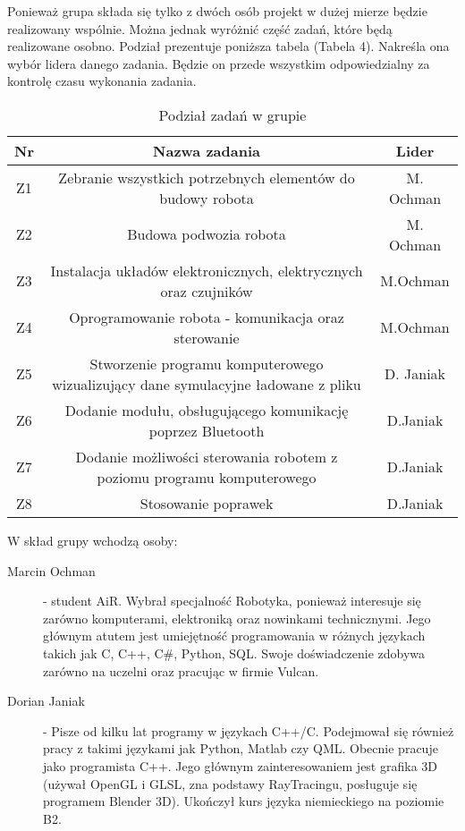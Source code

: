 Ponieważ grupa składa się tylko z dwóch osób projekt w dużej mierze będzie realizowany wspólnie. Można  jednak wyróżnić część zadań, które będą realizowane osobno. Podział prezentuje poniższa tabela (Tabela 4). Nakreśla ona wybór lidera danego zadania. Będzie on przede wszystkim odpowiedzialny za kontrolę czasu wykonania zadania.



\begin{table}[!htbp]
\begin{center}
\begin{tabular}{|c|c|c|}

\hline
\textbf{Nr} & \textbf{Nazwa zadania} & \textbf{Lider} \\ \hline\hline
Z1 & Zebranie wszystkich potrzebnych elementów do budowy robota & M. Ochman \\ \hline
Z2 & Budowa podwozia robota & M. Ochman \\ \hline
Z3 & Instalacja układów elektronicznych, elektrycznych oraz czujników & M.Ochman \\ \hline
Z4 & Oprogramowanie robota - komunikacja oraz sterowanie & M.Ochman \\ \hline
Z5 &Stworzenie programu komputerowego wizualizujący dane symulacyjne ładowane z pliku & D. Janiak \\ \hline
Z6 & Dodanie modułu, obsługującego komunikację poprzez Bluetooth & D.Janiak \\ \hline
Z7 & Dodanie możliwości sterowania robotem z poziomu programu komputerowego & D.Janiak \\ \hline
Z8 & Stosowanie poprawek & D.Janiak \\ \hline


\end{tabular}
\caption{Podział zadań w grupie}
\end{center}
\end{table}

W skład grupy wchodzą osoby:
\begin{description}
\item[Marcin Ochman] - student AiR. Wybrał specjalność Robotyka, ponieważ interesuje się zarówno komputerami, elektroniką oraz nowinkami technicznymi.
	Jego głównym atutem jest umiejętność programowania w różnych językach takich jak C, C++, C\#, Python, SQL. 
	Swoje doświadczenie zdobywa zarówno na uczelni oraz pracując w firmie Vulcan.	
\item[Dorian Janiak] - Pisze od kilku lat programy w językach C++/C. Podejmował się również pracy z takimi językami jak Python, Matlab czy QML. Obecnie pracuje jako programista C++. Jego głównym zainteresowaniem jest grafika 3D (używał OpenGL i GLSL, zna podstawy RayTracingu, posługuje się programem Blender 3D). Ukończył kurs języka niemieckiego na poziomie B2.
\end{description}
